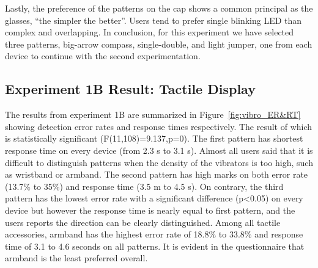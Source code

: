 \documentclass{sigchi}
\begin{document}
Lastly, the preference of the patterns on the cap shows a common principal as the glasses, \textquotedblleft the simpler the better\textquotedblright. Users tend to prefer single blinking LED than complex and overlapping. In conclusion, for this experiment we have selected three patterns, big-arrow compass, single-double, and light jumper, one from each device to continue with the second experimentation.


\subsection{Experiment 1B Result: Tactile Display}
The results from experiment 1B are summarized in Figure~\ref{fig:vibro_ER&RT} showing detection error rates and response times respectively. The result of which is statistically significant (F(11,108)=9.137,p=0). The first pattern has shortest response time on every device (from 2.3 s to 3.1 s). Almost all users said that it is difficult to distinguish patterns when the density of the vibrators is too high, such as wristband or armband. The second pattern has high marks on both error rate (13.7\% to 35\%) and response time (3.5 m to 4.5 s). On contrary, the third pattern has the lowest error rate with a significant difference (p\textless0.05) on every device but however the response time is nearly equal to first pattern, and the users reports the direction can be clearly distinguished. Among all tactile accessories, armband has the highest error rate of 18.8\% to 33.8\% and response time of 3.1 to 4.6 seconds on all patterns. It is evident in the questionnaire that armband is the least preferred overall.
\end{document}
